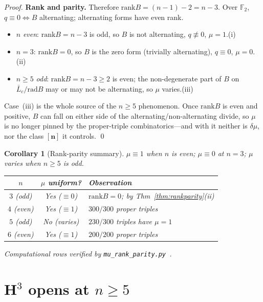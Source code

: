 \documentclass[11pt,a4paper]{article}
\newtheorem{corollary}[theorem]{Corollary}
\theoremstyle{remark}
\newcommand{\F}{\mathbb{F}}
\newcommand{\rad}{\mathrm{rad}}
\newcommand{\rank}{\mathrm{rank}}
\begin{document}
\begin{proof}
\medskip
\noindent\textbf{Rank and parity.}
Therefore $\rank B=(n-1)-2=n-3$.  Over $\F_2$, $q\equiv0\iff B$ alternating;
alternating forms have even rank.
\begin{itemize}
\item $n$ \emph{even}: $\rank B=n-3$ is odd, so $B$ is not alternating,
  $q\not\equiv0$, $\mu=1$.\quad(i)
\item $n=3$: $\rank B=0$, so $B$ is the zero form (trivially alternating),
  $q\equiv0$, $\mu=0$.\quad(ii)
\item $n\ge5$ \emph{odd}: $\rank B=n-3\ge2$ is even; the non-degenerate part
  of $B$ on $\bar L_c/\rad B$ may or may not be alternating, so $\mu$
  varies.\quad(iii)
\end{itemize}
Case~(iii) is the whole source of the $n\ge5$ phenomenon.  Once $\rank B$ is
even and positive, $B$ can fall on either side of the alternating/non-alternating
divide, so $\mu$ is no longer pinned by the proper-triple combinatorics---and
with it neither is $\delta\mu$, nor the class $[\mathbf{n}]$ it controls.
\qed
\end{proof}

\begin{corollary}[Rank-parity summary]\label{cor:periodicity}
$\mu\equiv1$ when $n$ is even; $\mu\equiv0$ at $n=3$; $\mu$ varies when
$n\ge5$ is odd.
\begin{center}
\begin{tabular}{ccl}
\toprule
$n$ & $\mu$ uniform? & Observation \\
\midrule
$3$ (odd)  & Yes ($\equiv0$) & $\rank B=0$; by Thm~\ref{thm:rankparity}(ii) \\
$4$ (even) & Yes ($\equiv1$) & $300/300$ proper triples \\
$5$ (odd)  & No (varies)    & $230/300$ triples have $\mu=1$ \\
$6$ (even) & Yes ($\equiv1$) & $200/200$ proper triples \\
\bottomrule
\end{tabular}
\end{center}
\vspace{-2pt}
\noindent
Computational rows verified by \texttt{mu\_rank\_parity.py}~\cite{PaperXXsuppl}.
\end{corollary}

\section{H$^3$ opens at $n\ge5$}\label{sec:h3opens}
\end{document}
